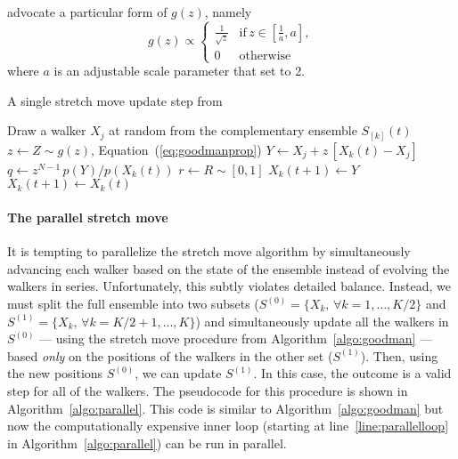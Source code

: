 \documentclass[12pt,preprint]{aastex}
\newcommand{\numberparagraphs}{}
\newcommand{\nonumberparagraphs}{}
\newcommand{\Eq}[1]{Equation~(\ref{eq:#1})}
\newcommand{\eq}[1]{\Eq{#1}}
\newcommand{\eqlabel}[1]{\label{eq:#1}}
\newcommand{\Algo}[1]{Algorithm~\ref{algo:#1}}
\newcommand{\algo}[1]{\Algo{#1}}
\newcommand{\algolabel}[1]{\label{algo:#1}}
\newcommand{\ensemble}{S}
\newcommand{\colorens}[1]{\ensemble^{(#1)}}
\newcommand{\red}{\colorens{0}}
\newcommand{\blue}{\colorens{1}}
\renewcommand{\vector}[1]{#1}
\begin{document}
 advocate a particular form of $g(z)$, namely
\begin{equation}
    \eqlabel{goodmanprop}
    g(z) \propto \left \{ \begin{array}{ll}
        \displaystyle\frac{1}{\sqrt{z}} & \mathrm{if}\, z\in
                        \left [ \displaystyle\frac{1}{a}, a \right ], \\
        0 & \mathrm{otherwise}
    \end{array} \right .
\end{equation}
where $a$ is an adjustable scale parameter that  set
to 2.

\nonumberparagraphs
\begin{algorithm}
\caption{A single stretch move update step from 
    \algolabel{goodman}}
\begin{algorithmic}[1]
    \STATE Draw a walker $X_j$ at random from the complementary ensemble %
        $\ensemble_{[k]}(t)$
    \STATE $z \gets Z \sim g(z)$, \Eq{goodmanprop}
    \STATE $\vector{Y} \gets \vector{X_j} %
                + z \, [ \vector{X_k} (t) - \vector{X_j}]$
    \STATE $q \gets z^{N-1} \, p(Y)/p(X_k(t))$ \label{line:hard}%
        \hspace{1cm}{\footnotesize\it // This line is generally expensive}
    \STATE $r \gets R \sim [0, 1]$
    \IF{$r \ge q$, \eq{acceptance}}
        \STATE $X_k(t+1) \gets Y$
    \ELSE
        \STATE $X_k(t+1) \gets X_k(t)$
    \ENDIF
\ENDFOR
\end{algorithmic}
\end{algorithm}
\numberparagraphs

\paragraph{The parallel stretch move}

It is tempting to parallelize the stretch move algorithm by
simultaneously advancing each walker based on the state of the ensemble
instead of evolving the walkers in series. Unfortunately, this subtly
violates detailed balance. Instead, we must split the full ensemble
into two subsets
($\red = \{ \vector{X_k}, \, \forall k = 1, \ldots, K/2 \}$ and
$\blue = \{ \vector{X_k}, \, \forall k = K/2+1, \ldots, K \}$) and
simultaneously update all the walkers in $\red$
--- using the stretch move procedure from \algo{goodman} ---
based \emph{only} on the positions of the walkers in the other set
($\blue$). Then, using the new positions $\red$,
we can update $\blue$. In this case, the outcome is a valid step
for all of the walkers. The pseudocode for
this procedure is shown in \algo{parallel}. This code is similar to
\algo{goodman} but now the computationally expensive inner loop
(starting at line~\ref{line:parallelloop} in \algo{parallel}) can be run in
parallel.
\end{document}
